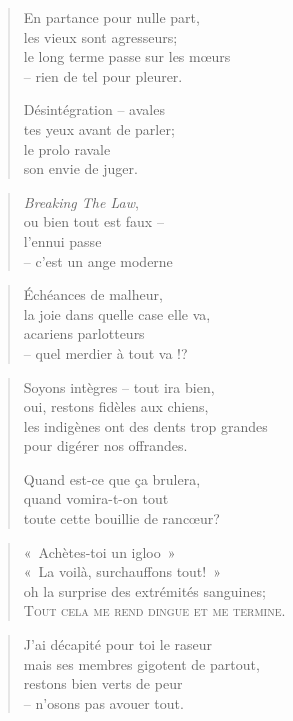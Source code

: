   \begin{verse}
    En partance pour nulle part,\\
    les vieux sont agresseurs;\\
    le long terme passe sur les mœurs\\
    -- rien de tel pour pleurer.

    Désintégration -- avales\\
    tes yeux avant de parler;\\
    le prolo ravale\\
    son envie de juger.
  \end{verse}
  \begin{verse}
    \textit{Breaking The Law},\\
    ou bien tout est faux --\\
    l’ennui passe\\
    -- c’est un ange moderne
  \end{verse}
  \begin{verse}
    Échéances de malheur,\\
    la joie dans quelle case elle va,\\
    acariens parlotteurs\\
    -- quel merdier à tout va !?
  \end{verse}
  \begin{verse}
    Soyons intègres -- tout ira bien,\\
    oui, restons fidèles aux chiens,\\
    les indigènes ont des dents trop grandes\\
    pour digérer nos offrandes.

    Quand est-ce que ça brulera,\\
    quand vomira-t-on tout\\
    toute cette bouillie de rancœur?
  \end{verse}
  \begin{verse}
    «~Achètes-toi un igloo~»\\
    «~La voilà, surchauffons tout!~»\\
    oh la surprise des extrémités sanguines;\\
    \textsc{Tout cela me rend dingue et me termine.}
  \end{verse}
  \begin{verse}
    J’ai décapité pour toi le raseur\\
    mais ses membres gigotent de partout,\\
    restons bien verts de peur\\
    -- n’osons pas avouer tout.
  \end{verse}
